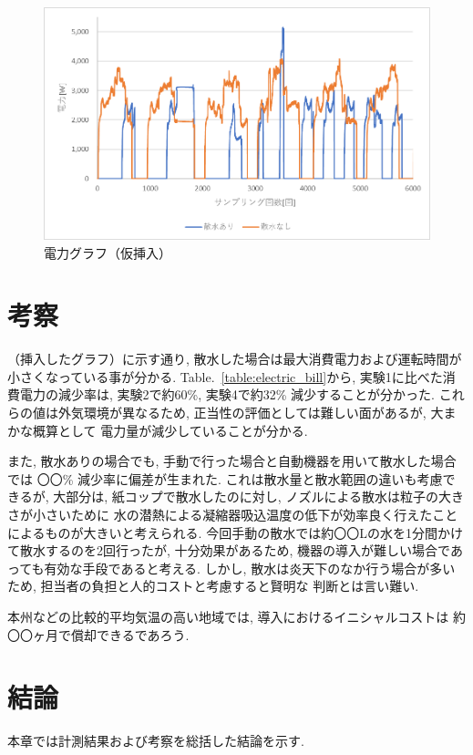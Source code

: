 \documentclass[a4j,fleqn,dvipdfmx,uplatex]{jsarticle}
\newcommand{\tableref}[1]{Table.\ \ref{#1}}
\begin{document}
\begin{figure}[htb]
\begin{minipage}[b]{0.46\linewidth}
    \end{minipage}
    \begin{minipage}[b]{0.46\linewidth}
      \centering
      \includegraphics[width=\linewidth]{img/ex1.png}
    \end{minipage}
  \caption{電力グラフ（仮挿入）}
  \label{fig2:ex_outputs}
\end{figure}

\section{考察}
（挿入したグラフ）に示す通り, 散水した場合は最大消費電力および運転時間が
小さくなっている事が分かる. 
\tableref{table:electric_bill}から, 実験1に比べた消費電力の減少率は, 実験2で約60\%, 
実験4で約32\% 減少することが分かった. 
これらの値は外気環境が異なるため, 正当性の評価としては難しい面があるが, 大まかな概算として
電力量が減少していることが分かる. 

また, 散水ありの場合でも, 手動で行った場合と自動機器を用いて散水した場合では
〇〇\% 減少率に偏差が生まれた. これは散水量と散水範囲の違いも考慮できるが, 
大部分は, 紙コップで散水したのに対し, ノズルによる散水は粒子の大きさが小さいために
水の潜熱による凝縮器吸込温度の低下が効率良く行えたことによるものが大きいと考えられる. 
今回手動の散水では約〇〇Lの水を1分間かけて散水するのを2回行ったが, 十分効果があるため, 
機器の導入が難しい場合であっても有効な手段であると考える. 
しかし, 散水は炎天下のなか行う場合が多いため, 担当者の負担と人的コストと考慮すると賢明な
判断とは言い難い. 

本州などの比較的平均気温の高い地域では, 導入におけるイニシャルコストは
約〇〇ヶ月で償却できるであろう. 

\section{結論}
本章では計測結果および考察を総括した結論を示す. 
\end{document}
